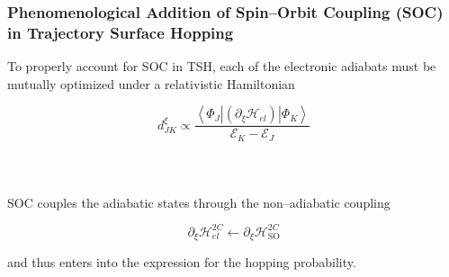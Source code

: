 \documentclass[usepdftitle=false,10pt]{beamer}
\newcommand{\innerop}[3]{\left\langle #1 \left\vert #2 \right\vert #3 \right\rangle}  %
\begin{document}
\begin{frame}
  \frametitle{Phenomenological Addition of Spin--Orbit Coupling (SOC) in
  Trajectory Surface Hopping}

  To properly account for SOC in TSH, each of the electronic adiabats must
  be mutually optimized under a relativistic Hamiltonian

  \begin{equation*}
    d_{JK}^\xi \propto \frac{\innerop{\Phi_J}{(\partial_\xi \mathcal{H}_{el})}{\Phi_K}}{\mathcal{E}_K - \mathcal{E}_J}
  \end{equation*}
  ~\\
  ~\\
  ~\\

  SOC couples the adiabatic states through the non--adiabatic coupling

  \begin{equation*}
    \partial_\xi \mathcal{H}^{2C}_{el} \leftarrow \partial_\xi \mathcal{H}^{2C}_\mathrm{SO}
  \end{equation*}

  and thus enters into the expression for the hopping probability.
\end{frame}


%
%
%
%
%
\end{document}
